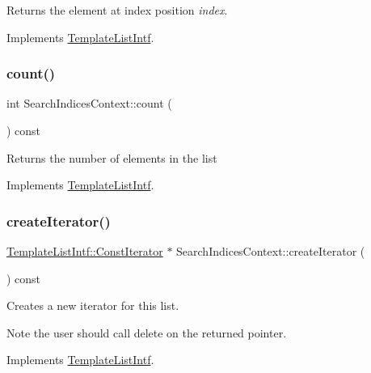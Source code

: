 Returns the element at index position {\itshape index}. 

Implements \mbox{\hyperlink{class_template_list_intf_aa51e57e72eacf4e8ce1055ee30a0f7f8}{Template\+List\+Intf}}.

\mbox{\label{class_search_indices_context_aa8606de3f00d255756169fbf11b134e8}} 
\subsubsection{\texorpdfstring{count()}{count()}}
{\footnotesize\ttfamily int Search\+Indices\+Context\+::count (\begin{DoxyParamCaption}{ }\end{DoxyParamCaption}) const\hspace{0.3cm}{\ttfamily [virtual]}}

Returns the number of elements in the list 

Implements \mbox{\hyperlink{class_template_list_intf_a329e49e33484c2aa5106aac1bf4e5216}{Template\+List\+Intf}}.

\mbox{\label{class_search_indices_context_a0247f88bc151ed4620c36386bdae999f}} 
\subsubsection{\texorpdfstring{createIterator()}{createIterator()}}
{\footnotesize\ttfamily \mbox{\hyperlink{class_template_list_intf_1_1_const_iterator}{Template\+List\+Intf\+::\+Const\+Iterator}} $\ast$ Search\+Indices\+Context\+::create\+Iterator (\begin{DoxyParamCaption}{ }\end{DoxyParamCaption}) const\hspace{0.3cm}{\ttfamily [virtual]}}

Creates a new iterator for this list. \begin{DoxyNote}{Note}
the user should call delete on the returned pointer. 
\end{DoxyNote}


Implements \mbox{\hyperlink{class_template_list_intf_a56b82384db24c3e121076a1da046d378}{Template\+List\+Intf}}.

